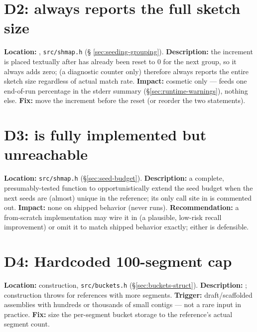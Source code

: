 \section{D2:  always reports the full sketch size}
\label{sec:d2}
\textbf{Location:} , \texttt{src/shmap.h} (\S
\ref{sec:seeding-grouping}). \textbf{Description:} the increment
 is placed textually after  has
already been reset to 0 for the next group, so it always adds zero;  (a
diagnostic counter only) therefore always reports the entire sketch size regardless of actual
match rate. \textbf{Impact:} cosmetic only --- feeds one end-of-run percentage in the stderr
summary (\S\ref{sec:runtime-warnings}), nothing else. \textbf{Fix:} move the increment before the
reset (or reorder the two statements).

\section{D3:  is fully implemented but unreachable}
\label{sec:d3}
\textbf{Location:} \texttt{src/shmap.h} (\S\ref{sec:seed-budget}). \textbf{Description:} a
complete, presumably-tested function to opportunistically extend the seed budget when the next
seeds are (almost) unique in the reference; its only call site in  is commented
out. \textbf{Impact:} none on shipped behavior (never runs). \textbf{Recommendation:} a
from-scratch implementation may wire it in (a plausible, low-risk recall improvement) or omit it
to match shipped behavior exactly; either is defensible.

\section{D4: Hardcoded 100-segment cap}
\label{sec:d4}
\textbf{Location:}  construction, \texttt{src/buckets.h} (\S\ref{sec:buckets-struct}).
\textbf{Description:} ; construction throws for references with more
segments. \textbf{Trigger:} draft/scaffolded assemblies with hundreds or thousands of small
contigs --- not a rare input in practice. \textbf{Fix:} size the per-segment bucket storage to the
reference's actual segment count.

